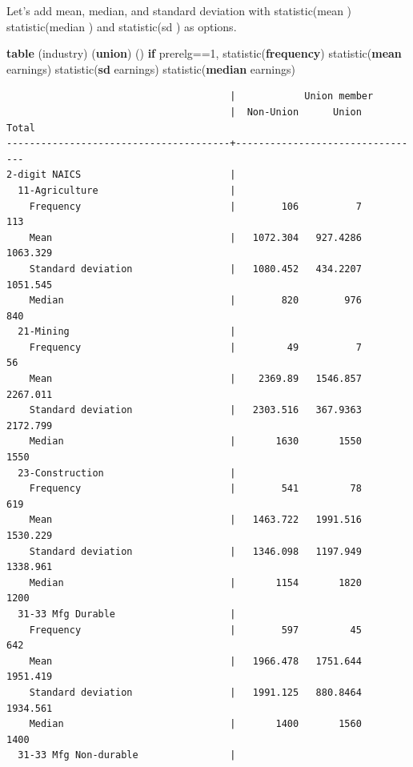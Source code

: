 \documentclass[
]{book}
\newenvironment{Shaded}{\begin{snugshade}}{\end{snugshade}}
\newcommand{\FunctionTok}[1]{\textcolor[rgb]{0.13,0.29,0.53}{\textbf{#1}}}
\newcommand{\KeywordTok}[1]{\textcolor[rgb]{0.13,0.29,0.53}{\textbf{#1}}}
\newcommand{\NormalTok}[1]{#1}
\begin{document}
Let's add mean, median, and standard deviation with statistic(mean ) statistic(median ) and statistic(sd ) as options.

\begin{Shaded}
\begin{Highlighting}[]
\KeywordTok{table}\NormalTok{ (industry) (}\KeywordTok{union}\NormalTok{) () }\KeywordTok{if}\NormalTok{ prerelg==1, statistic(}\KeywordTok{frequency}\NormalTok{) statistic(}\KeywordTok{mean}\NormalTok{ earnings) statistic(}\FunctionTok{sd}\NormalTok{ earnings) statistic(}\KeywordTok{median}\NormalTok{ earnings)}
\end{Highlighting}
\end{Shaded}

\begin{verbatim}
                                       |            Union member         
                                       |  Non-Union      Union      Total
---------------------------------------+---------------------------------
2-digit NAICS                          |                                 
  11-Agriculture                       |                                 
    Frequency                          |        106          7        113
    Mean                               |   1072.304   927.4286   1063.329
    Standard deviation                 |   1080.452   434.2207   1051.545
    Median                             |        820        976        840
  21-Mining                            |                                 
    Frequency                          |         49          7         56
    Mean                               |    2369.89   1546.857   2267.011
    Standard deviation                 |   2303.516   367.9363   2172.799
    Median                             |       1630       1550       1550
  23-Construction                      |                                 
    Frequency                          |        541         78        619
    Mean                               |   1463.722   1991.516   1530.229
    Standard deviation                 |   1346.098   1197.949   1338.961
    Median                             |       1154       1820       1200
  31-33 Mfg Durable                    |                                 
    Frequency                          |        597         45        642
    Mean                               |   1966.478   1751.644   1951.419
    Standard deviation                 |   1991.125   880.8464   1934.561
    Median                             |       1400       1560       1400
  31-33 Mfg Non-durable                |                                 

\end{verbatim}
\end{document}
